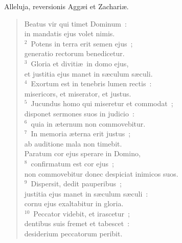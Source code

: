 \lettrine[lines=3,image=true,loversize=0.05,lraise=-0.03]{A}{}lleluja, reversionis Agg\ae i et Zachari\ae . \begin{flushleft}\begin{verse}\vspace{6pt}Beatus vir qui timet Dominum~:\\ in mandatis ejus volet nimis.\\
${}^{2}$~Potens in terra erit semen ejus~;\\ generatio rectorum benedicetur.\\
${}^{3}$~Gloria et diviti\ae\ in domo ejus,\\ et justitia ejus manet in s\ae culum s\ae culi.\\
${}^{4}$~Exortum est in tenebris lumen rectis~:\\ misericors, et miserator, et justus.\\
${}^{5}$~Jucundus homo qui miseretur et commodat~;\\ disponet sermones suos in judicio~:\\
${}^{6}$~quia in \ae ternum non commovebitur.\\
${}^{7}$~In memoria \ae terna erit justus~;\\ ab auditione mala non timebit.\\ Paratum cor ejus sperare in Domino,\\
${}^{8}$~confirmatum est cor ejus~;\\ non commovebitur donec despiciat inimicos suos.\\
${}^{9}$~Dispersit, dedit pauperibus~;\\ justitia ejus manet in s\ae culum s\ae culi~:\\ cornu ejus exaltabitur in gloria.\\
${}^{10}$~Peccator videbit, et irascetur~;\\ dentibus suis fremet et tabescet~:\\ desiderium peccatorum peribit.\end{verse}\end{flushleft}



